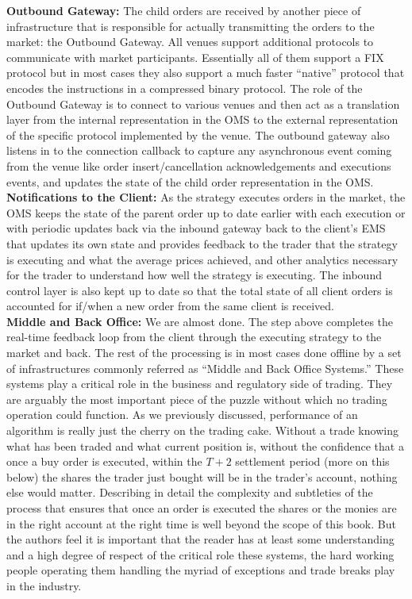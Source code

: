 \noindent\textbf{Outbound Gateway:} The child orders are received by another piece of infrastructure that is responsible for actually transmitting the orders to the market: the Outbound Gateway. All venues support additional protocols to communicate with market participants. Essentially all of them support a FIX protocol but in most cases they also support a much faster ``native'' protocol that encodes the instructions in a compressed binary protocol. The role of the Outbound Gateway is to connect to various venues and then act as a translation layer from the internal representation in the OMS to the external representation of the specific protocol implemented by the venue. The outbound gateway also listens in to the connection callback to capture any asynchronous event coming from the venue like order insert/cancellation acknowledgements and executions events, and updates the state of the child order representation in the OMS. \\


\noindent\textbf{Notifications to the Client:} As the strategy executes orders in the market, the OMS keeps the state of the parent order up to date earlier with each execution or with periodic updates back via the inbound gateway back to the client's EMS that updates its own state and provides feedback to the trader that the strategy is executing and what the average prices achieved, and other analytics necessary for the trader to understand how well the strategy is executing. The inbound control layer is also kept up to date so that the total state of all client orders is accounted for if/when a new order from the same client is received. \\


\noindent\textbf{Middle and Back Office:} We are almost done. The step above completes the real-time feedback loop from the client through the executing strategy to the market and back. The rest of the processing is in most cases done offline by a set of infrastructures commonly referred as ``Middle and Back Office Systems.'' These systems play a critical role in the business and regulatory side of trading. They are arguably the most important piece of the puzzle without which no trading operation could function. As we previously discussed, performance of an algorithm is really just the cherry on the trading cake. Without a trade knowing what has been traded and what current position is, without the confidence that a once a buy order is executed, within the $T+2$ settlement period (more on this below) the shares the trader just bought will be in the trader's account, nothing else would matter. Describing in detail the complexity and subtleties of the process that ensures that once an order is executed the shares or the monies are in the right account at the right time is well beyond the scope of this book. But the authors feel it is important that the reader has at least some understanding and a high degree of respect of the critical role these systems, the hard working people operating them handling the myriad of exceptions and trade breaks play in the industry.


